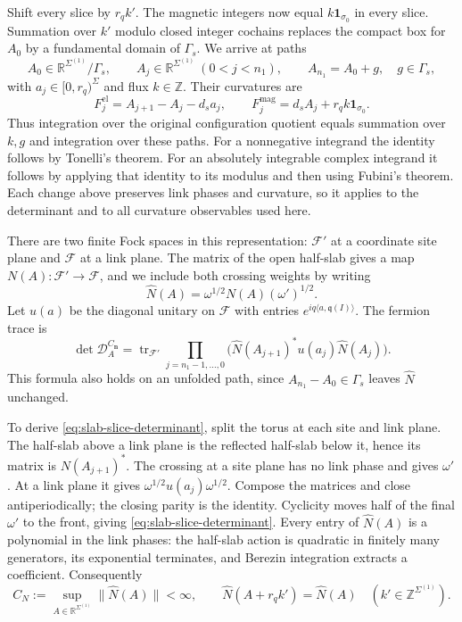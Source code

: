 \documentclass[11pt,letterpaper,reqno]{amsart}
\newcommand{\R}{\mathbb R}
\newcommand{\Z}{\mathbb Z}
\DeclareMathOperator{\tr}{tr}
\begin{document}
Shift every slice by $r_qk'$. The magnetic integers now equal
$k\mathbf1_{\sigma_0}$ in every slice. Summation over $k'$ modulo
closed integer cochains replaces the compact box for $A_0$ by a
fundamental domain of $\Gamma_s$. We arrive at paths
\[
 A_0\in\R^{\Sigma^{(1)}}/\Gamma_s,\qquad
 A_j\in\R^{\Sigma^{(1)}}\ (0<j<n_1),\qquad
 A_{n_1}=A_0+g,\quad g\in\Gamma_s,
\]
with $a_j\in[0,r_q)^{\Sigma}$ and flux $k\in\Z$. Their curvatures are
\begin{equation}\label{eq:slab-unfolded-curvatures}
 F_j^{\mathrm{el}}=A_{j+1}-A_j-d_sa_j,
 \qquad F_j^{\mathrm{mag}}=d_sA_j+r_qk\mathbf1_{\sigma_0}.
\end{equation}
Thus integration over the original configuration quotient equals
summation over $k,g$ and integration over these paths. For a
nonnegative integrand the identity follows by Tonelli's theorem. For
an absolutely integrable complex integrand it follows by applying
that identity to its modulus and then using Fubini's theorem. Each
change above preserves link phases and curvature, so it applies to
the determinant and to all curvature observables used here.

There are two finite Fock spaces in this representation: $\mathcal F'$
at a coordinate site plane and $\mathcal F$ at a link plane. The
matrix of the open half-slab gives a map
$N(A):\mathcal F'\to\mathcal F$, and we include both crossing weights
by writing
\[
 \widehat N(A)=\omega^{1/2}N(A)(\omega')^{1/2}.
\]
Let $u(a)$ be the diagonal unitary on $\mathcal F$ with entries
$e^{iq\langle a,\mathfrak q(I)\rangle}$. The fermion trace is
\begin{equation}\label{eq:slab-slice-determinant}
 \det \mathcal D_A^{C_{\mathbf n}}=
    \tr_{\mathcal F'}\prod_{j=n_1-1,\ldots,0}
             \bigl(\widehat N(A_{j+1})^*u(a_j)\widehat N(A_j)\bigr).
\end{equation}
This formula also holds on an unfolded path, since
$A_{n_1}-A_0\in\Gamma_s$ leaves $\widehat N$ unchanged.

To derive \eqref{eq:slab-slice-determinant}, split the torus at each
site and link plane. The half-slab above a link plane is the reflected
half-slab below it, hence its matrix is $N(A_{j+1})^*$. The crossing
at a site plane has no link phase and gives $\omega'$. At a link
plane it gives $\omega^{1/2}u(a_j)\omega^{1/2}$. Compose the matrices
and close antiperiodically; the closing parity is the identity.
Cyclicity moves half of the final $\omega'$ to the front, giving
\eqref{eq:slab-slice-determinant}. Every entry of $\widehat N(A)$ is
a polynomial in the link phases: the half-slab action is quadratic
in finitely many generators, its exponential terminates, and
Berezin integration extracts a coefficient. Consequently
\begin{equation}\label{eq:slab-half-matrix-bound}
 C_N:=\sup_{A\in\R^{\Sigma^{(1)}}}\|\widehat N(A)\|<\infty,
 \qquad\widehat N(A+r_qk')=\widehat N(A)
       \quad(k'\in\Z^{\Sigma^{(1)}}).
\end{equation}
\end{document}
